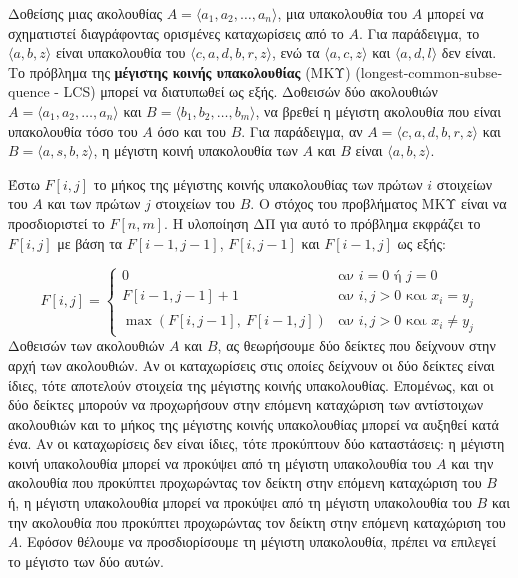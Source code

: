 \documentclass[12pt,a4paper]{article}
\begin{document}
Δοθείσης μιας ακολουθίας $A = \langle a_1, a_2, \ldots, a_n \rangle$,
μια υπακολουθία του $A$ μπορεί να σχηματιστεί διαγράφοντας ορισμένες
καταχωρίσεις από το $A$. Για παράδειγμα, το $\langle a, b, z \rangle$
είναι υπακολουθία του $\langle c, a, d, b, r, z \rangle$, ενώ τα
$\langle a, c, z \rangle$ και $\langle a, d, l \rangle$ δεν είναι.
Το πρόβλημα της \textbf{μέγιστης κοινής υπακολουθίας} (ΜΚΥ) 
(\foreignlanguage{english}{longest-common-subsequence - LCS}) μπορεί
να διατυπωθεί ως εξής. Δοθεισών δύο ακολουθιών
$A = \langle a_1, a_2, \ldots, a_n \rangle$ και
$B = \langle b_1, b_2, \ldots, b_m \rangle$, να βρεθεί η μέγιστη
ακολουθία που είναι υπακολουθία τόσο του $A$ όσο και του $B$. Για
παράδειγμα, αν $A = \langle c, a, d, b, r, z \rangle$ και
$B = \langle a, s, b, z \rangle$, η μέγιστη κοινή υπακολουθία
των $A$ και $B$ είναι $\langle a, b, z \rangle$.

Έστω $F[i, j]$ το μήκος της μέγιστης κοινής υπακολουθίας των
πρώτων $i$ στοιχείων του $A$ και των πρώτων $j$ στοιχείων του $B$.
Ο στόχος του προβλήματος ΜΚΥ είναι να προσδιοριστεί το $F[n, m]$.
Η υλοποίηση ΔΠ για αυτό το πρόβλημα εκφράζει το $F[i, j]$ με βάση
τα $F[i-1, j-1]$, $F[i, j-1]$ και $F[i-1, j]$ ως εξής:

\[
F[i, j] =
\begin{cases}
0 & \text{αν } i = 0 \text{ ή } j = 0 \\[4pt]
F[i-1, j-1] + 1 & \text{αν } i, j > 0 \text{ και } x_i = y_j \\[4pt]
\max\left(F[i, j-1],\ F[i-1, j]\right) & \text{αν } i, j > 0 \text{ και } x_i \neq y_j
\end{cases}
\]
\vspace{0.2cm}
Δοθεισών των ακολουθιών $A$ και $B$, ας θεωρήσουμε δύο δείκτες που
δείχνουν στην αρχή των ακολουθιών. Αν οι καταχωρίσεις στις οποίες
δείχνουν οι δύο δείκτες είναι ίδιες, τότε αποτελούν στοιχεία της
μέγιστης κοινής υπακολουθίας. Επομένως, και οι δύο δείκτες μπορούν
να προχωρήσουν στην επόμενη καταχώριση των αντίστοιχων ακολουθιών και
το μήκος της μέγιστης κοινής υπακολουθίας μπορεί να αυξηθεί κατά
ένα. Αν οι καταχωρίσεις δεν είναι ίδιες, τότε προκύπτουν δύο
καταστάσεις: η μέγιστη κοινή υπακολουθία μπορεί να προκύψει από
τη μέγιστη υπακολουθία του $A$ και την ακολουθία που προκύπτει
προχωρώντας τον δείκτη στην επόμενη καταχώριση του $B$ ή, η
μέγιστη υπακολουθία μπορεί να προκύψει από τη μέγιστη
υπακολουθία του $B$ και την ακολουθία που προκύπτει προχωρώντας τον
δείκτη στην επόμενη καταχώριση του $A$. Εφόσον θέλουμε να
προσδιορίσουμε τη μέγιστη υπακολουθία, πρέπει να επιλεγεί το
μέγιστο των δύο αυτών.
\end{document}
